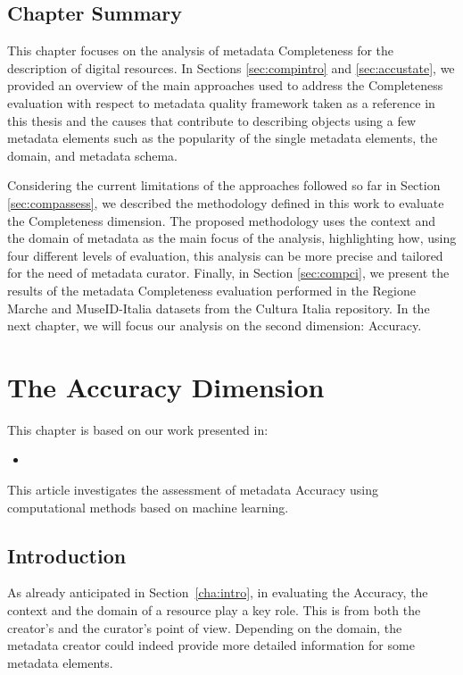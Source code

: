 \documentclass[epsfig,a4paper,12pt,titlepage]{book}
\begin{document}
\section{Chapter Summary}
\label{sec:compconclusion}

This chapter focuses on the analysis of metadata Completeness for the description of digital resources.
In Sections \ref{sec:compintro} and \ref{sec:accustate}, we provided an overview of the main approaches used to address the Completeness evaluation with respect to metadata quality framework taken as a reference in this thesis and the causes that contribute to describing objects using a few metadata elements such as the popularity of the single metadata elements, the domain, and metadata schema.

Considering the current limitations of the approaches followed so far in Section \ref{sec:compassess}, we described the methodology defined in this work to evaluate the Completeness dimension. The proposed methodology uses the context and the domain of metadata as the main focus of the analysis, highlighting how, using four different levels of evaluation, this analysis can be more precise and tailored for the need of metadata curator. Finally, in  Section \ref{sec:compci}, we present the results of the metadata Completeness evaluation performed in the Regione Marche and MuseID-Italia datasets from the Cultura Italia repository. In the next chapter, we will focus our analysis on the second dimension: Accuracy.
 

\chapter{The Accuracy Dimension}
\label{cha:accu}
This chapter is based on our work presented in:
\begin{itemize}
    \item {}
\end{itemize}
This article investigates the assessment of metadata Accuracy using computational methods based on machine learning. 

\section{Introduction}
\label{sec:accuintro} 
 As already anticipated in Section~\ref{cha:intro}, in evaluating the Accuracy, the context and the domain of a resource play a key role. This is from both the creator's and the curator's point of view. Depending on the domain, the metadata creator could indeed provide more detailed information for some metadata elements. 
\end{document}
